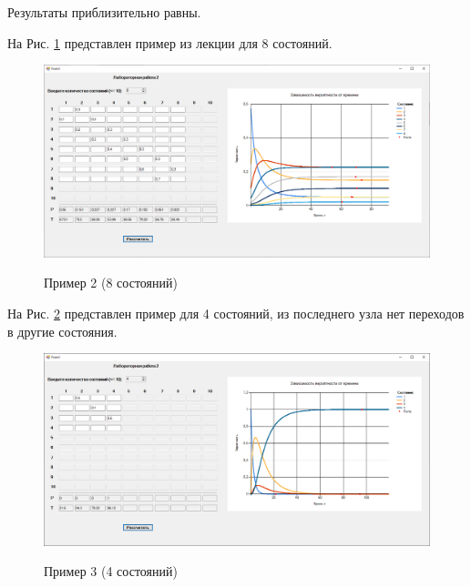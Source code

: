 Результаты приблизительно равны. 

На Рис. \ref{fig2:image} представлен пример из лекции для 8 состояний. 

\begin{figure}[h]
	\begin{center}
		{\includegraphics[scale = 0.42]{img/ex2_8.png}}
		\caption{Пример 2 (8 состояний)}
		\label{fig2:image}
	\end{center}
\end{figure}

\newpage

На Рис. \ref{fig3:image} представлен пример для 4 состояний, из последнего узла нет переходов в другие состояния. 

\begin{figure}[h]
	\begin{center}
		{\includegraphics[scale = 0.42]{img/ex3_4.png}}
		\caption{Пример 3 (4 состояний)}
		\label{fig3:image}
	\end{center}
\end{figure}
\newpage

